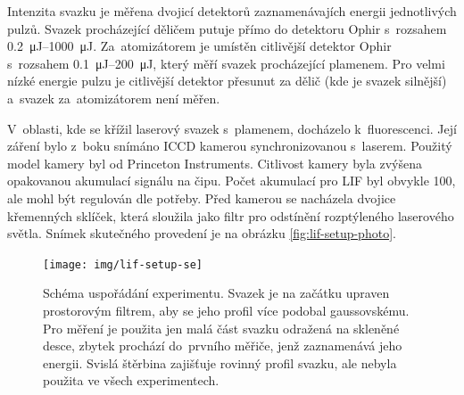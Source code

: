 Intenzita svazku je měřena dvojicí detektorů
zaznamenávajích energii jednotlivých pulzů.
Svazek procházející děličem putuje přímo do detektoru
Ophir 
s~rozsahem \SIrange{0.2}{1000}{\micro\joule}.
Za~atomizátorem je umístěn citlivější detektor
Ophir 
s~rozsahem \SIrange{0.1}{200}{\micro\joule},
který měří svazek procházející plamenem.
Pro velmi nízké energie pulzu je citlivější detektor přesunut
za dělič (kde je svazek silnější) a~svazek za~atomizátorem není měřen.

V~oblasti, kde se křížil laserový svazek s~plamenem, docházelo k~fluorescenci.
Její záření bylo z~boku snímáno ICCD kamerou synchronizovanou s~laserem.
Použitý model kamery byl  od Princeton Instruments.
Citlivost kamery byla zvýšena opakovanou akumulací signálu na čipu.
Počet akumulací pro LIF byl obvykle 100, ale mohl být regulován dle potřeby.
Před kamerou se nacházela dvojice křemenných sklíček,
která sloužila jako filtr pro odstínění rozptýleného laserového světla.
Snímek skutečného provedení je na obrázku \ref{fig:lif-setup-photo}.

\begin{figure}[htb]
	\centering
	\texttt{[image: img/lif-setup-se]}
	\caption{Schéma uspořádání experimentu.
		Svazek je na začátku upraven prostorovým filtrem,
		aby se jeho profil více podobal gaussovskému.
		Pro měření je použita jen malá část svazku odražená na skleněné desce,
		zbytek prochází do~prvního měřiče, jenž zaznamenává jeho energii.
		Svislá štěrbina zajišťuje rovinný profil svazku,
		ale nebyla použita ve všech experimentech.}
	\label{fig:lif-setup}
\end{figure}

